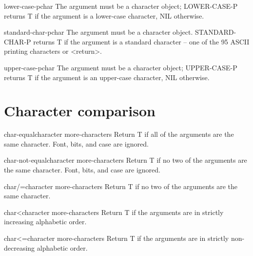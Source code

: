 \documentclass[10pt,english]{book}
\begin{document}
\begin{function}{lower-case-p}{char}
  The argument must be a character object; LOWER-CASE-P returns T if the
   argument is a lower-case character, NIL otherwise.
\end{function}

\begin{function}{standard-char-p}{char}
  The argument must be a character object. STANDARD-CHAR-P returns T if the
   argument is a standard character -- one of the 95 ASCII printing characters
   or <return>.
\end{function}

\begin{function}{upper-case-p}{char}
  The argument must be a character object; UPPER-CASE-P returns T if the
   argument is an upper-case character, NIL otherwise.
\end{function}

\section{Character comparison}
\label{sec:character-comparison}

\begin{function}{char-equal}{character \rest more-characters}
  Return T if all of the arguments are the same character.
  Font, bits, and case are ignored.
\end{function}

\begin{function}{char-not-equal}{character \rest more-characters}
  Return T if no two of the arguments are the same character.
   Font, bits, and case are ignored.
\end{function}

\begin{function}{char/=}{character \rest more-characters}
  Return T if no two of the arguments are the same character.
\end{function}

\begin{function}{char<}{character \rest more-characters}
  Return T if the arguments are in strictly increasing alphabetic order.
\end{function}

\begin{function}{char<=}{character \rest more-characters}
  Return T if the arguments are in strictly non-decreasing alphabetic order.
\end{function}
\end{document}
